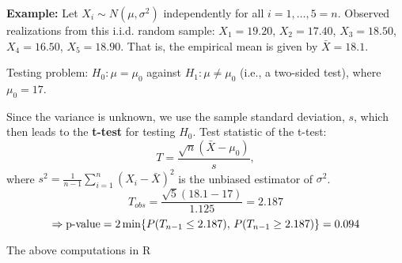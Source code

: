 \documentclass[
]{book}
\begin{document}
\hfill\break

\textbf{Example:}
Let \(X_i\sim N(\mu,\sigma^2)\) independently for all \(i=1,\dots,5=n\). Observed realizations from this i.i.d. random sample: \(X_1=19.20\), \(X_2=17.40\), \(X_3=18.50\), \(X_4=16.50\), \(X_5=18.90\). That is, the empirical mean is given by \(\bar X =18.1\).

\hfill\break

Testing problem: \(H_0:\mu=\mu_0\) against \(H_1:\mu\ne\mu_0\) (i.e., a two-sided test), where \(\mu_0=17\).

\hfill\break

Since the variance is unknown, we use the sample standard deviation, \(s\), which then leads to the \textbf{t-test} for testing \(H_0\). Test statistic of the t-test:
\[T=\frac{\sqrt{n}(\bar X-\mu_0)}{s},\]
where \(s^2=\frac{1}{n-1}\sum_{i=1}^n (X_i-\bar X)^2\) is the unbiased estimator of \(\sigma^2\).
\[T_{obs}=\frac{\sqrt{5}(18.1-17)}{1.125}=2.187\]
\[\Rightarrow \hbox{p-value}=2\min\{P(T_{n-1}\leq 2.187),\, P(T_{n-1}\geq 2.187)\}=0.094\]

\hfill\break

The above computations in R
\end{document}
